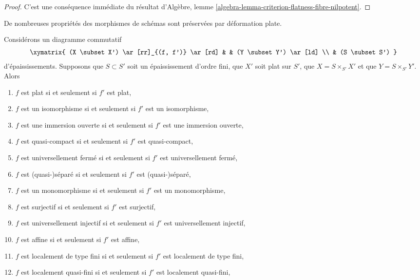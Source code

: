 \begin{proof}
C'est une conséquence immédiate du résultat d'Algèbre,
lemme \ref{algebra-lemma-criterion-flatness-fibre-nilpotent}.
\end{proof}

\noindent
De nombreuses propriétés des morphismes de schémas sont préservées par déformation
plate.

\begin{lemma}
\label{lemma-deform-property}
Considérons un diagramme commutatif
$$
\xymatrix{
(X \subset X') \ar[rr]_{(f, f')} \ar[rd] & & (Y \subset Y') \ar[ld] \\
& (S \subset S')
}
$$
d'épaississements. Supposons que $S \subset S'$ soit un épaississement d'ordre fini,
que $X'$ soit plat sur $S'$, que $X = S \times_{S'} X'$ et que
$Y = S \times_{S'} Y'$. Alors
\begin{enumerate}
\item $f$ est plat si et seulement si $f'$ est plat,
\label{item-flat}
\item $f$ est un isomorphisme si et seulement si $f'$ est un isomorphisme,
\label{item-isomorphism}
\item $f$ est une immersion ouverte si et seulement si $f'$ est une immersion ouverte,
\label{item-open-immersion}
\item $f$ est quasi-compact si et seulement si $f'$ est quasi-compact,
\label{item-quasi-compact}
\item $f$ est universellement fermé si et seulement si $f'$ est universellement fermé,
\label{item-universally-closed}
\item $f$ est (quasi-)séparé si et seulement si $f'$ est (quasi-)séparé,
\label{item-separated}
\item $f$ est un monomorphisme si et seulement si $f'$ est un monomorphisme,
\label{item-monomorphism}
\item $f$ est surjectif si et seulement si $f'$ est surjectif,
\label{item-surjective}
\item $f$ est universellement injectif si et seulement si $f'$ est universellement injectif,
\label{item-universally-injective}
\item $f$ est affine si et seulement si $f'$ est affine,
\label{item-affine}
\item
\label{item-finite-type}
$f$ est localement de type fini si et seulement si $f'$ est localement de type fini,
\item $f$ est localement quasi-fini si et seulement si $f'$ est localement quasi-fini,
\label{item-quasi-finite}

\end{enumerate}
\end{lemma}
